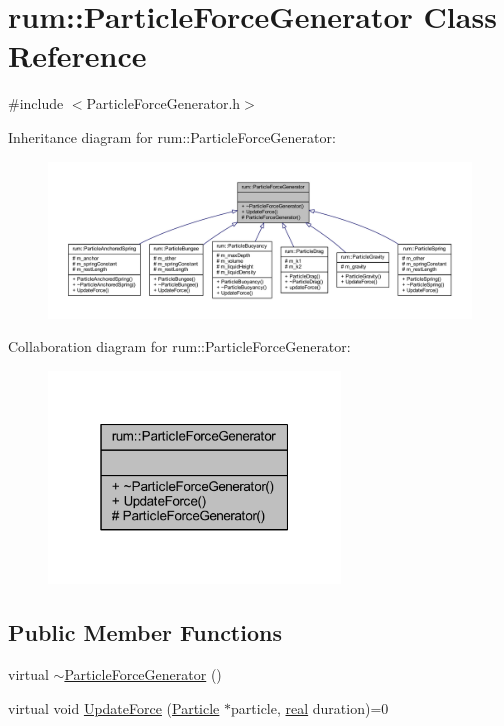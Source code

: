 \hypertarget{classrum_1_1_particle_force_generator}{}\section{rum\+:\+:Particle\+Force\+Generator Class Reference}
\label{classrum_1_1_particle_force_generator}


{\ttfamily \#include $<$Particle\+Force\+Generator.\+h$>$}



Inheritance diagram for rum\+:\+:Particle\+Force\+Generator\+:\nopagebreak
\begin{figure}[H]
\begin{center}
\leavevmode
\includegraphics[width=350pt]{classrum_1_1_particle_force_generator__inherit__graph}
\end{center}
\end{figure}


Collaboration diagram for rum\+:\+:Particle\+Force\+Generator\+:\nopagebreak
\begin{figure}[H]
\begin{center}
\leavevmode
\includegraphics[width=220pt]{classrum_1_1_particle_force_generator__coll__graph}
\end{center}
\end{figure}
\subsection*{Public Member Functions}
\begin{DoxyCompactItemize}
\item 
virtual \hyperlink{classrum_1_1_particle_force_generator_aa6dd4ed9f382793958a76187e84fa104}{$\sim$\+Particle\+Force\+Generator} ()
\item 
virtual void \hyperlink{classrum_1_1_particle_force_generator_aca758295718deb8569796185ccbe8d54}{Update\+Force} (\hyperlink{classrum_1_1_particle}{Particle} $\ast$particle, \hyperlink{namespacerum_a7e8cca23573d5eaead0f138cbaa4862c}{real} duration)=0
\end{DoxyCompactItemize}
